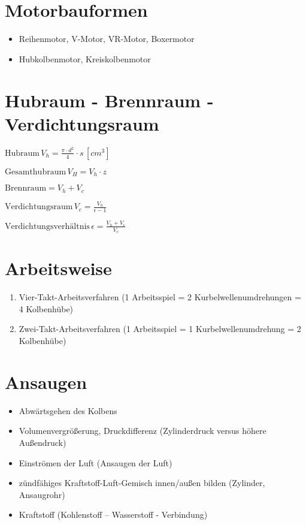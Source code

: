 \section{Motorbauformen}\label{motorbauformen}

\begin{itemize}
\item
  Reihenmotor, V-Motor, VR-Motor, Boxermotor
\item
  Hubkolbenmotor, Kreiskolbenmotor
\end{itemize}

\section{Hubraum - Brennraum -
Verdichtungsraum}\label{hubraum-brennraum-verdichtungsraum}

$\text{Hubraum} \, V_h = \frac{\pi \cdot d^2}{4} \cdot s \,[cm^3]$

$\text{Gesamthubraum} \, V_H = V_h \cdot z$

$\text{Brennraum} = V_h + V_c$

$\text{Verdichtungsraum} \, V_c = \frac{V_h}{\epsilon - 1}$

$\text{Verdichtungsverhältnis} \, \epsilon = \frac{V_h + V_c}{V_c}$

\section{Arbeitsweise}\label{arbeitsweise}

\begin{enumerate}
\def\labelenumi{(\arabic{enumi})}
\item
  Vier-Takt-Arbeitsverfahren (1 Arbeitsspiel = 2 Kurbelwellenumdrehungen
  = 4 Kolbenhübe)
\item
  Zwei-Takt-Arbeitsverfahren (1 Arbeitsspiel = 1 Kurbelwellenumdrehung =
  2 Kolbenhübe)
\end{enumerate}

\section{Ansaugen}\label{ansaugen}

\begin{itemize}
\item
  Abwärtsgehen des Kolbens
\item
  Volumenvergrößerung, Druckdifferenz (Zylinderdruck versus höhere
  Außendruck)
\item
  Einströmen der Luft (Ansaugen der Luft)
\item
  zündfähiges Kraftstoff-Luft-Gemisch innen/außen bilden (Zylinder,
  Ansaugrohr)
\item
  Kraftstoff (Kohlenstoff -- Wasserstoff - Verbindung)
\end{itemize}

